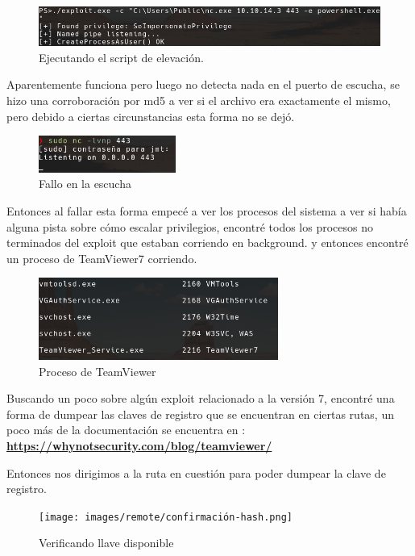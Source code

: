 \documentclass{article}
\begin{document}
\begin{figure}[h]
	\center
	\includegraphics[width=\textwidth]{images/remote/fallo-exploit.png}
	\caption{Ejecutando el script de elevación.}
\end{figure}
Aparentemente funciona pero luego no detecta nada en el puerto de escucha, se hizo una corroboración por md5 a ver si el archivo era exactamente el mismo, pero debido a ciertas circunstancias esta forma no se dejó.
\begin{figure}[h]
	\center
	\includegraphics[width=0.4\textwidth]{images/remote/fallo-escucha.png}
	\caption{Fallo en la escucha}
\end{figure}
Entonces al fallar esta forma empecé a ver los procesos del sistema a ver si había alguna pista sobre cómo escalar privilegios, encontré todos los procesos no terminados del exploit que estaban corriendo en background.
y entonces encontré un proceso de TeamViewer7 corriendo.
\begin{figure}[h]
	\center
	\includegraphics[width=0.7\textwidth]{images/remote/proceso-encontrado.png}
	\caption{Proceso de TeamViewer}
\end{figure}
Buscando un poco sobre algún exploit relacionado a la versión 7, encontré una forma de dumpear las claves de registro que se encuentran en ciertas rutas, un poco más de la documentación se encuentra en : 
\textbf{\href{https://whynotsecurity.com/blog/teamviewer/}{https://whynotsecurity.com/blog/teamviewer/}}

\clearpage

Entonces nos dirigimos a la ruta en cuestión para poder dumpear la clave de registro.
\begin{figure}[h]
	\center 
	\texttt{[image: images/remote/confirmación-hash.png]}
	\caption{Verificando llave disponible}
\end{figure}
\end{document}
